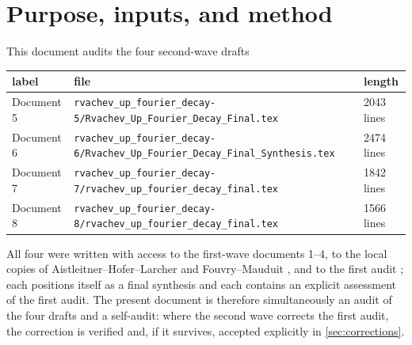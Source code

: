 \documentclass[11pt,oneside]{article}
\theoremstyle{definition}
\theoremstyle{remark}
\begin{document}
\begin{abstract}
The audit recomputes the corpus constants at forty working digits:
$\varrho_1=0.6613226020605656150735291\ldots$,
$A_1=0.0912661241315882122866\ldots$,
$A_1^{\log}=0.0938606357567812635407\ldots$
Five small numerical errata in the wave are identified (last digits of
$B_1$ and $A_1^{\log}$ prints, over-precise direct-quadrature digits,
finite-level feature values evaluated at rounded cell boundaries), plus
one shared artifact inherited by \emph{every} document including the
first audit: the sixteen-digit print
$\kappa_1=2.748070014871334$ carries the truncation of $\varrho_1$ at
fifteen digits; the resolved value is
$\kappa_1=2.7480700148713326739\ldots$  The first audit's own errata
are itemized: the phrase ``unattainable in principle'' (its theorem was
correctly scoped; the slogan was not), the grid-limited profile range
$[0.9249,1.1133]$ (true features reach $\approx[0.91627,1.11814]$), and
the constant $A_1^{\log}=0.0938610$ (seventh-figure error from a
finite-shell running mean).
\end{abstract}

\tableofcontents
\newpage

\section{Purpose, inputs, and method}
\label{sec:purpose}

This document audits the four second-wave drafts
\begin{center}
\begin{tabular}{@{}lll@{}}
\toprule
label & file & length \\
\midrule
Document 5 & \nolinkurl{rvachev_up_fourier_decay-5/Rvachev_Up_Fourier_Decay_Final.tex} & 2043 lines \\
Document 6 & \nolinkurl{rvachev_up_fourier_decay-6/Rvachev_Up_Fourier_Decay_Final_Synthesis.tex} & 2474 lines \\
Document 7 & \nolinkurl{rvachev_up_fourier_decay-7/rvachev_up_fourier_decay_final.tex} & 1842 lines \\
Document 8 & \nolinkurl{rvachev_up_fourier_decay-8/rvachev_up_fourier_decay_final.tex} & 1566 lines \\
\bottomrule
\end{tabular}
\end{center}
All four were written with access to the first-wave documents 1--4, to
the local copies of Aistleitner--Hofer--Larcher \cite{ahl2017} and
Fouvry--Mauduit \cite{fm1996}, and to the first audit \cite{audit}; each
positions itself as a final synthesis and each contains an explicit
assessment of the first audit.  The present document is therefore
simultaneously an audit of the four drafts and a self-audit: where the
second wave corrects the first audit, the correction is verified and,
if it survives, accepted explicitly in \cref{sec:corrections}.
\end{document}

